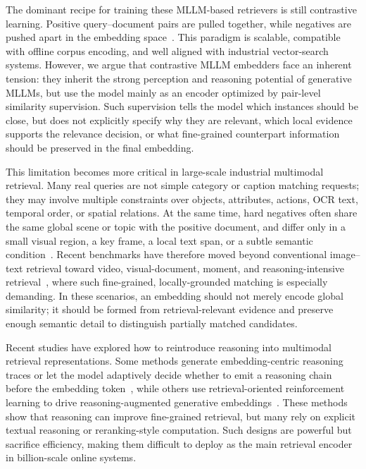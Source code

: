 The dominant recipe for training these MLLM-based retrievers is still contrastive learning. Positive query--document pairs are pulled together, while negatives are pushed apart in the embedding space~\cite{infonce,CLIP,E5,GTE}. This paradigm is scalable, compatible with offline corpus encoding, and well aligned with industrial vector-search systems. However, we argue that contrastive MLLM embedders face an inherent tension: they inherit the strong perception and reasoning potential of generative MLLMs, but use the model mainly as an encoder optimized by pair-level similarity supervision. Such supervision tells the model which instances should be close, but does not explicitly specify why they are relevant, which local evidence supports the relevance decision, or what fine-grained counterpart information should be preserved in the final embedding.

This limitation becomes more critical in large-scale industrial multimodal retrieval. Many real queries are not simple category or caption matching requests; they may involve multiple constraints over objects, attributes, actions, OCR text, temporal order, or spatial relations. At the same time, hard negatives often share the same global scene or topic with the positive document, and differ only in a small visual region, a key frame, a local text span, or a subtle semantic condition~\cite{unime}. Recent benchmarks have therefore moved beyond conventional image--text retrieval toward video, visual-document, moment, and reasoning-intensive retrieval~\cite{VLM2VecV2,ColPali,visrag,MMBright}, where such fine-grained, locally-grounded matching is especially demanding. In these scenarios, an embedding should not merely encode global similarity; it should be formed from retrieval-relevant evidence and preserve enough semantic detail to distinguish partially matched candidates.

Recent studies have explored how to reintroduce reasoning into multimodal retrieval representations. Some methods generate embedding-centric reasoning traces or let the model adaptively decide whether to emit a reasoning chain before the embedding token~\cite{ThinkThenEmbed,TRACE}, while others use retrieval-oriented reinforcement learning to drive reasoning-augmented generative embeddings~\cite{UMER1,EmbedRL}. These methods show that reasoning can improve fine-grained retrieval, but many rely on explicit textual reasoning
or reranking-style computation. Such designs are powerful but sacrifice efficiency, making them difficult to deploy as the main retrieval encoder in billion-scale online systems.

